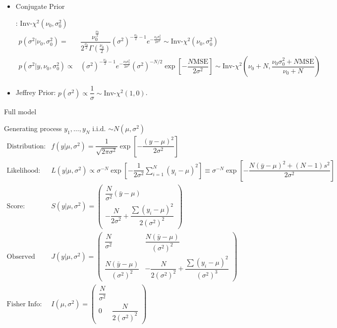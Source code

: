 \begin{itemize}[topsep=2pt,itemsep=0pt]
    \item \hypertarget{NormalWithMeanConjugate}{Conjugate Prior}: $ \mathrm{Inv } $-$ \chi^2(\nu _0, \sigma _0^2) $
    \begin{align*}
        p(\sigma ^2|\nu _0,\sigma _0^2)=& \dfrac{\nu _0^{\frac{\nu _0}{2}}}{2^{\frac{\nu _0}{2}}\Gamma (\frac{\nu _0}{2})}(\sigma ^2)^{-\frac{\nu _0}{2}-1}e^{-\frac{\nu _0\sigma _0^2}{2\sigma ^2}}\sim \mathrm{ Inv }\text{-}\chi^2(\nu _0,\sigma _0^2)   \\
        p(\sigma ^2|y,\nu _0,\sigma _0^2)\propto&(\sigma ^2)^{-\frac{\nu _0}{2}-1}e^{-\frac{\nu _0\sigma _0^2}{2\sigma ^2}}(\sigma ^2)^{-N/2}\exp\left[ -\dfrac{ N\mathrm{ MSE }  }{ 2\sigma ^2 }  \right]\sim \mathrm{ Inv }\text{-}\chi^2\left( \nu _0+N, \dfrac{ \nu _0\sigma _0^2 + N\mathrm{ MSE }  }{ \nu _0+N }  \right)
    \end{align*}
    
    
    \item Jeffrey Prior: $ p(\sigma ^2 )\propto \dfrac{ 1 }{ \sigma  }\sim  \mathrm{ Inv }\text{-}\chi^2(1,0) $.
\end{itemize}


\begin{point}
    Full model
\end{point}

Generating process $ y_1,\ldots,y_N $ i.i.d. $ \sim N(\mu  ,\sigma ^2) $
\begin{align*}
    \text{Distribution:}&f(y|\mu ,\sigma ^2  )=\dfrac{1}{\sqrt{2\pi\sigma ^2}}\exp\left[ -\dfrac{(y-\mu  )^2}{2\sigma ^2} \right]\\
    \text{Likelihood:}&L(y|\mu ,\sigma ^2)\propto \sigma^{-N} \exp\left[ -\dfrac{1}{2\sigma ^2}\sum_{i=1}^N (y_i-\mu )^2 \right]\equiv \sigma^{-N} \exp\left[ -\dfrac{N(\bar{y}-\mu )^2+(N-1)s^2}{2\sigma ^2}   \right] \\
    \text{Score:}&S(y|\mu ,\sigma ^2)= \begin{pmatrix}
        \dfrac{N}{\sigma ^2}(\bar{y}-\mu )\\
        -\dfrac{N}{2\sigma ^2}+\dfrac{\sum (y_i-\mu )^2}{2(\sigma ^2)^2}
    \end{pmatrix}\\
    \text{Observed Info:}&J(y|\mu ,\sigma ^2)= \begin{pmatrix}
        \dfrac{N}{\sigma ^2}&\dfrac{N(\bar{y}-\mu )}{(\sigma ^2)^2}\\
        \dfrac{N(\bar{y}-\mu )}{(\sigma ^2)^2}&-\dfrac{N }{2(\sigma ^2)^2}+\dfrac{\sum (y_i-\mu )^2}{(\sigma ^2)^3}
    \end{pmatrix}\\
    \text{Fisher Info:}&I(\mu ,\sigma^2 )=\begin{pmatrix}
        \dfrac{N}{\sigma ^2}&\\
        0&\dfrac{N}{2(\sigma ^2)^2}
    \end{pmatrix}
\end{align*}

